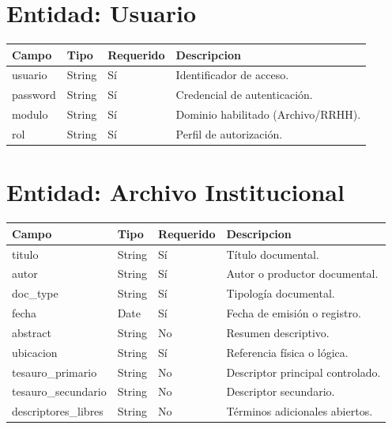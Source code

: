 \section{Entidad: Usuario}
\begin{longtable}{p{} p{} p{} p{}}
\toprule
\textbf{Campo} & \textbf{Tipo} & \textbf{Requerido} & \textbf{Descripcion} \\
\midrule
usuario & String & Sí & Identificador de acceso. \\
password & String & Sí & Credencial de autenticación. \\
modulo & String & Sí & Dominio habilitado (Archivo/RRHH). \\
rol & String & Sí & Perfil de autorización. \\
\bottomrule
\end{longtable}

\section{Entidad: Archivo Institucional}
\begin{longtable}{p{} p{} p{} p{}}
\toprule
\textbf{Campo} & \textbf{Tipo} & \textbf{Requerido} & \textbf{Descripcion} \\
\midrule
titulo & String & Sí & Título documental. \\
autor & String & Sí & Autor o productor documental. \\
doc\_type & String & Sí & Tipología documental. \\
fecha & Date & Sí & Fecha de emisión o registro. \\
abstract & String & No & Resumen descriptivo. \\
ubicacion & String & Sí & Referencia física o lógica. \\
tesauro\_primario & String & No & Descriptor principal controlado. \\
tesauro\_secundario & String & No & Descriptor secundario. \\
descriptores\_libres & String & No & Términos adicionales abiertos. \\
\bottomrule
\end{longtable}

